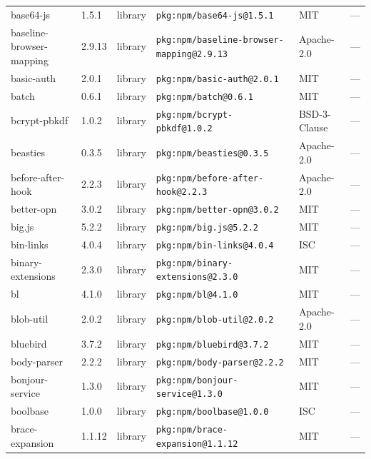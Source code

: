 \documentclass[11pt,a4paper]{article}
\begin{document}
\begin{longtable}{|p{4cm}|p{2cm}|p{1.6cm}|p{5cm}|p{1.5cm}|p{3.5cm}|}
\raggedright base64-js & 1.5.1 & library & \small\texttt{pkg:npm/base64-js@1.5.1} & MIT & \small — \\
\raggedright baseline-browser-mapping & 2.9.13 & library & \small\texttt{pkg:npm/baseline-browser-mapping@2.9.13} & Apache-2.0 & \small — \\
\raggedright basic-auth & 2.0.1 & library & \small\texttt{pkg:npm/basic-auth@2.0.1} & MIT & \small — \\
\raggedright batch & 0.6.1 & library & \small\texttt{pkg:npm/batch@0.6.1} & MIT & \small — \\
\raggedright bcrypt-pbkdf & 1.0.2 & library & \small\texttt{pkg:npm/bcrypt-pbkdf@1.0.2} & BSD-3-Clause & \small — \\
\raggedright beasties & 0.3.5 & library & \small\texttt{pkg:npm/beasties@0.3.5} & Apache-2.0 & \small — \\
\raggedright before-after-hook & 2.2.3 & library & \small\texttt{pkg:npm/before-after-hook@2.2.3} & Apache-2.0 & \small — \\
\raggedright better-opn & 3.0.2 & library & \small\texttt{pkg:npm/better-opn@3.0.2} & MIT & \small — \\
\raggedright big.js & 5.2.2 & library & \small\texttt{pkg:npm/big.js@5.2.2} & MIT & \small — \\
\raggedright bin-links & 4.0.4 & library & \small\texttt{pkg:npm/bin-links@4.0.4} & ISC & \small — \\
\raggedright binary-extensions & 2.3.0 & library & \small\texttt{pkg:npm/binary-extensions@2.3.0} & MIT & \small — \\
\raggedright bl & 4.1.0 & library & \small\texttt{pkg:npm/bl@4.1.0} & MIT & \small — \\
\raggedright blob-util & 2.0.2 & library & \small\texttt{pkg:npm/blob-util@2.0.2} & Apache-2.0 & \small — \\
\raggedright bluebird & 3.7.2 & library & \small\texttt{pkg:npm/bluebird@3.7.2} & MIT & \small — \\
\raggedright body-parser & 2.2.2 & library & \small\texttt{pkg:npm/body-parser@2.2.2} & MIT & \small — \\
\raggedright bonjour-service & 1.3.0 & library & \small\texttt{pkg:npm/bonjour-service@1.3.0} & MIT & \small — \\
\raggedright boolbase & 1.0.0 & library & \small\texttt{pkg:npm/boolbase@1.0.0} & ISC & \small — \\
\raggedright brace-expansion & 1.1.12 & library & \small\texttt{pkg:npm/brace-expansion@1.1.12} & MIT & \small — \\

\end{longtable}
\end{document}

